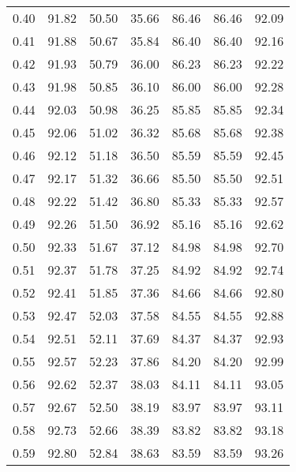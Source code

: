 \begin{tabular}{|c|c|c|c|c|c|c|}
      0.40 &     91.82 &     50.50 &      35.66 &   86.46 &      86.46 &         92.09 \\
      0.41 &     91.88 &     50.67 &      35.84 &   86.40 &      86.40 &         92.16 \\
      0.42 &     91.93 &     50.79 &      36.00 &   86.23 &      86.23 &         92.22 \\
      0.43 &     91.98 &     50.85 &      36.10 &   86.00 &      86.00 &         92.28 \\
      0.44 &     92.03 &     50.98 &      36.25 &   85.85 &      85.85 &         92.34 \\
      0.45 &     92.06 &     51.02 &      36.32 &   85.68 &      85.68 &         92.38 \\
      0.46 &     92.12 &     51.18 &      36.50 &   85.59 &      85.59 &         92.45 \\
      0.47 &     92.17 &     51.32 &      36.66 &   85.50 &      85.50 &         92.51 \\
      0.48 &     92.22 &     51.42 &      36.80 &   85.33 &      85.33 &         92.57 \\
      0.49 &     92.26 &     51.50 &      36.92 &   85.16 &      85.16 &         92.62 \\
      0.50 &     92.33 &     51.67 &      37.12 &   84.98 &      84.98 &         92.70 \\
      0.51 &     92.37 &     51.78 &      37.25 &   84.92 &      84.92 &         92.74 \\
      0.52 &     92.41 &     51.85 &      37.36 &   84.66 &      84.66 &         92.80 \\
      0.53 &     92.47 &     52.03 &      37.58 &   84.55 &      84.55 &         92.88 \\
      0.54 &     92.51 &     52.11 &      37.69 &   84.37 &      84.37 &         92.93 \\
      0.55 &     92.57 &     52.23 &      37.86 &   84.20 &      84.20 &         92.99 \\
      0.56 &     92.62 &     52.37 &      38.03 &   84.11 &      84.11 &         93.05 \\
      0.57 &     92.67 &     52.50 &      38.19 &   83.97 &      83.97 &         93.11 \\
      0.58 &     92.73 &     52.66 &      38.39 &   83.82 &      83.82 &         93.18 \\
      0.59 &     92.80 &     52.84 &      38.63 &   83.59 &      83.59 &         93.26 \\

\end{tabular}
